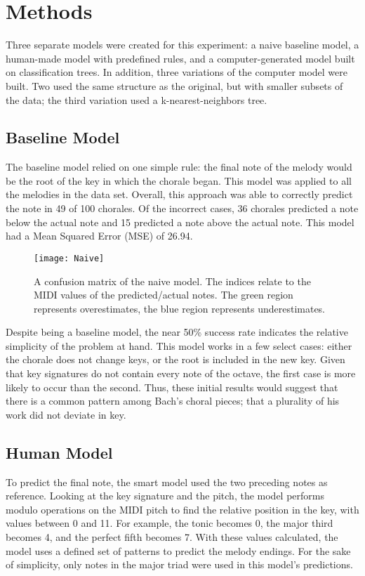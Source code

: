 \documentclass[12pt]{article}
\begin{document}
\section{Methods}
Three separate models were created for this experiment: a naive baseline model, a human-made model with predefined rules, and a computer-generated model built on classification trees. In addition, three variations of the computer model were built. Two used the same structure as the original, but with smaller subsets of the data; the third variation used a k-nearest-neighbors tree.

\subsection{Baseline Model}
The baseline model relied on one simple rule: the final note of the melody would be the root of the key in which the chorale began. This model was applied to all the melodies in the data set. Overall, this approach was able to correctly predict the note in 49 of 100 chorales. Of the incorrect cases, 36 chorales predicted a note below the actual note and 15 predicted a note above the actual note. This model had a Mean Squared Error (MSE) of 26.94.\\

\begin{figure}[h]
  \texttt{[image: Naive]}
  \centering
  \caption{A confusion matrix of the naive model. The indices relate to the MIDI values of the predicted/actual notes. The green region represents overestimates, the blue region represents underestimates.}
\end{figure}

Despite being a baseline model, the near 50\% success rate indicates the relative simplicity of the problem at hand. This model works in a few select cases: either the chorale does not change keys, or the root is included in the new key. Given that key signatures do not contain every note of the octave, the first case is more likely to occur than the second. Thus, these initial results would suggest that there is a common pattern among Bach's choral pieces; that a plurality of his work did not deviate in key.

\subsection{Human Model}
To predict the final note, the smart model used the two preceding notes as reference. Looking at the key signature and the pitch, the model performs modulo operations on the MIDI pitch to find the relative position in the key, with values between 0 and 11. For example, the tonic becomes 0, the major third becomes 4, and the perfect fifth becomes 7. With these values calculated, the model uses a defined set of patterns to predict the melody endings. For the sake of simplicity, only notes in the major triad were used in this model's predictions.\\
\end{document}
